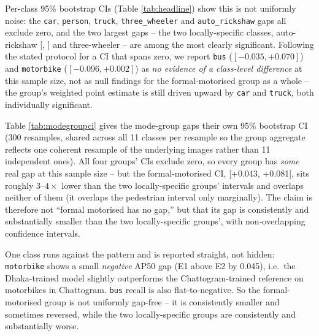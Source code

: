 \documentclass[conference,a4paper]{IEEEtran}
\begin{document}
Per-class 95\% bootstrap CIs (Table \ref{tab:headline}) show this is not uniformly
noise: the \texttt{car}, \texttt{person}, \texttt{truck}, \texttt{three\_wheeler} and
\texttt{auto\_rickshaw} gaps all exclude zero, and the two largest gaps -- the two
locally-specific classes, auto-rickshaw [\ArAPgapCILo{}, \ArAPgapCIHi{}] and
three-wheeler -- are among the most clearly significant. Following the stated protocol
for a CI that spans zero, we report \texttt{bus} ($[-0.035,+0.070]$) and
\texttt{motorbike} ($[-0.096,+0.002]$) as \emph{no evidence of a class-level
difference} at this sample size, not as null findings for the formal-motorised group
as a whole -- the group's weighted point estimate is still driven upward by
\texttt{car} and \texttt{truck}, both individually significant.



Table \ref{tab:modegroupci} gives the mode-group gaps their own 95\% bootstrap CI
(300 resamples, shared across all 11 classes per resample so the group aggregate
reflects one coherent resample of the underlying images rather than 11 independent
ones). All four groups' CIs exclude zero, so every group has \emph{some} real gap at
this sample size -- but the formal-motorised CI, [+0.043, +0.081], sits roughly
$3$--$4\times$ lower than the two locally-specific groups' intervals and overlaps
neither of them (it overlaps the pedestrian interval only marginally). The claim is
therefore not ``formal motorised has no gap,'' but that its gap is consistently and
substantially smaller than the two locally-specific groups', with non-overlapping
confidence intervals.

One class runs against the pattern and is reported straight, not hidden:
\texttt{motorbike} shows a small \emph{negative} AP50 gap (E1 above E2 by
0.045), i.e.\ the Dhaka-trained model slightly outperforms the Chattogram-trained
reference on motorbikes in Chattogram. \texttt{bus} recall is also flat-to-negative.
So the formal-motorised group is not uniformly gap-free -- it is consistently smaller
and sometimes reversed, while the two locally-specific groups are consistently and
substantially worse.
\end{document}
